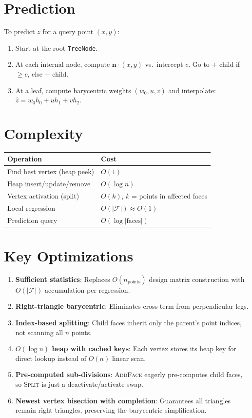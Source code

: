 \documentclass{article}
\begin{document}
\section{Prediction}

To predict $z$ for a query point $(x, y)$:
\begin{enumerate}
    \item Start at the root \texttt{TreeNode}.
    \item At each internal node, compute $\mathbf{n} \cdot (x, y)$ vs.\ intercept $c$. Go to $+$ child if $\geq c$, else $-$ child.
    \item At a leaf, compute barycentric weights $(w_0, u, v)$ and interpolate: $\hat{z} = w_0 h_0 + u h_1 + v h_2$.
\end{enumerate}

\section{Complexity}

\begin{table}[H]
\centering
\begin{tabular}{ll}
\toprule
\textbf{Operation} & \textbf{Cost} \\
\midrule
Find best vertex (heap peek) & $O(1)$ \\
Heap insert/update/remove & $O(\log n)$ \\
Vertex activation (split) & $O(k)$, $k$ = points in affected faces \\
Local regression & $O(|\mathcal{F}|) \approx O(1)$ \\
Prediction query & $O(\log |\text{faces}|)$ \\
\bottomrule
\end{tabular}
\end{table}

\section{Key Optimizations}

\begin{enumerate}
    \item \textbf{Sufficient statistics}: Replaces $O(n_{\text{points}})$ design matrix construction with $O(|\mathcal{F}|)$ accumulation per regression.
    \item \textbf{Right-triangle barycentric}: Eliminates cross-term from perpendicular legs.
    \item \textbf{Index-based splitting}: Child faces inherit only the parent's point indices, not scanning all $n$ points.
    \item \textbf{$O(\log n)$ heap with cached keys}: Each vertex stores its heap key for direct lookup instead of $O(n)$ linear scan.
    \item \textbf{Pre-computed sub-divisions}: \textsc{AddFace} eagerly pre-computes child faces, so \textsc{Split} is just a deactivate/activate swap.
    \item \textbf{Newest vertex bisection with completion}: Guarantees all triangles remain right triangles, preserving the barycentric simplification.
\end{enumerate}
\end{document}
